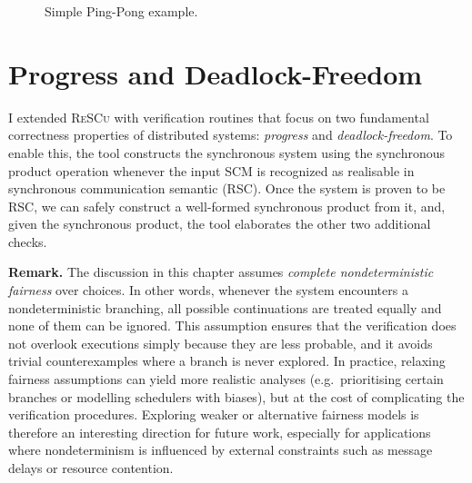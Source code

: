 \begin{example}
\begin{figure}[!ht]
\caption{Simple Ping-Pong example.}
\label{fig:ping}
\end{figure}

\end{example}

\section{Progress and Deadlock-Freedom}
I extended \textsc{ReSCu} with verification routines that focus on two
fundamental correctness properties of distributed systems: \emph{progress} and
\emph{deadlock-freedom}. To enable this, the tool constructs the synchronous
system using the synchronous product operation whenever the input SCM is recognized 
as realisable in synchronous communication semantic (RSC). 
Once the system is proven to be RSC, we can safely construct a 
well-formed synchronous product from it, and, given the synchronous product, 
the tool elaborates the other two additional checks.

\textbf{Remark.} 
The discussion in this chapter assumes \emph{complete nondeterministic 
fairness} over choices. In other words, whenever the system encounters 
a nondeterministic branching, all possible continuations are treated 
equally and none of them can be ignored. This assumption ensures that the 
verification does not overlook executions simply because they are less 
probable, and it avoids trivial counterexamples where a branch is never 
explored. In practice, relaxing fairness assumptions can yield more 
realistic analyses (e.g.\ prioritising certain branches or modelling 
schedulers with biases), but at the cost of complicating the 
verification procedures. Exploring weaker or alternative fairness models 
is therefore an interesting direction for future work, especially for 
applications where nondeterminism is influenced by external constraints 
such as message delays or resource contention.

